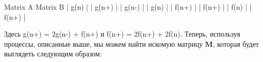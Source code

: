 \vspace{\baselineskip}
\begin{tcolorbox}
\hspace{3,5mm} Matrix A \hspace{20mm}Matrix B \newline
\hspace*{3mm}|\hspace{5mm}  g(n)  \hspace*{5mm}|  \hspace*{13mm} |\hspace*{2mm} g(n+)\hspace*{2mm} |\newline
\hspace*{3mm}|\hspace*{3mm} g(n-)\hspace*{3,5mm} |  \hspace*{13mm} |\hspace*{4mm}  g(n) \hspace{4mm}  |\newline
\hspace*{3mm}|\hspace{3mm}  f(n+)  \hspace*{2,5mm}|  \hspace*{13mm} |\hspace*{2,5mm} f(n+)\hspace*{2,4mm} |\newline
\hspace*{3mm}|\hspace*{5,3mm} f(n)\hspace*{5,4mm} |  \hspace*{13mm} |\hspace*{2,5mm}  f(n+) \hspace{1,1mm}  |
\end{tcolorbox}



\vspace{\baselineskip}
Здесь g(n+) = 2g(n-) + f(n+) и  f(n+) = 2f(n+) + 2f(n). Теперь, используя процессы, описанные выше, мы можем найти искомую матрицу \textbf{M}, которая будет выглядеть следующим образом:

